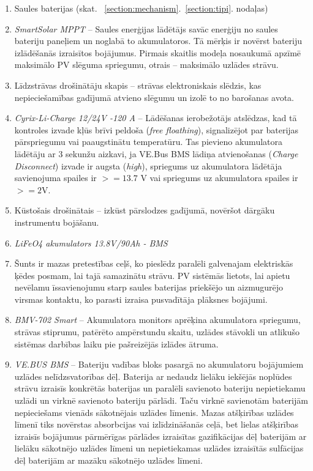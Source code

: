 \begin{enumerate}
\item Saules baterijas (skat. ~\ref{section:mechanism}.~\ref{section:tipi}. nodaļas)
\item \emph{SmartSolar MPPT} --
Saules enerģijas lādētājs savāc enerģiju no saules bateriju paneļiem un noglabā to akumulatoros. Tā mērķis ir novērst bateriju izlādēšanās izraisītos bojājumus. Pirmais skaitlis modeļa nosaukumā apzīmē maksimālo PV slēguma spriegumu, otrais -- maksimālo uzlādes strāvu.
\item Līdzstrāvas drošinātāju skapis --
strāvas elektroniskais slēdzis, kas nepieciešamības gadījumā atvieno slēgumu un izolē to no barošanas avota.
\item \emph{Cyrix-Li-Charge 12/24V -120 A} --
Lādēšanas ierobežotājs atslēdzas, kad tā kontroles izvade kļūs brīvi peldoša (\textit{free floathing}), signalizējot par baterijas pārspriegumu vai paaugstinātu temperatūru. Tas pievieno akumulatora lādētāju ar 3 sekunžu aizkavi, ja VE.Bus BMS lādiņa atvienošanas (\textit{Charge Disconnect}) izvade ir augsta (\textit{high}), spriegums uz akumulatora lādētāja savienojuma spailes ir $>= 13.7$ V vai spriegums uz akumulatora spailes ir $>= 2$V.
\item Kūstošais drošinātais --
izkūst pārslodzes gadījumā, novēršot dārgāku instrumentu bojāšanu.
\item \emph{LiFeO4 akumulators 13.8V/90Ah - BMS}
\item Šunts ir mazas pretestības ceļš, ko pieslēdz paralēli galvenajam elektriskās ķēdes posmam, lai tajā samazinātu strāvu. PV sistēmās lietots, lai apietu nevēlamu īssavienojumu starp saules baterijas priekšējo un aizmugurējo virsmas kontaktu, ko parasti izraisa pusvadītāja plāksnes bojājumi.
\item \emph{BMV-702 Smart} --
Akumulatora monitors aprēķina akumulatora spriegumu, strāvas stiprumu, patērēto ampērstundu skaitu, uzlādes stāvokli un atlikušo sistēmas darbības laiku pie pašreizējās izlādes ātruma.
\item \emph{VE.BUS BMS} --
Bateriju vadības bloks pasargā no akumulatoru bojājumiem uzlādes nelīdzsvatorības dēļ. Baterija ar nedaudz lielāku iekšējās noplūdes strāvu
izraisīs konkrētās baterijas un paralēli savienoto bateriju nepietiekamu uzlādi un virknē savienoto bateriju pārlādi. Taču virknē savienotām baterijām nepieciešams vienāds sākotnējais uzlādes līmenis. Mazas atšķirības uzlādes līmenī tiks novērstas absorbcijas vai izlīdzināšanās ceļā, bet lielas atšķirības izraisīs bojājumus pārmērīgas pārlādes izraisītas gazifikācijas dēļ baterijām ar lielāku sākotnējo uzlādes līmeni un nepietiekamas uzlādes izraisītās sulfācijas dēļ baterijām ar mazāku sākotnējo uzlādes līmeni.


\end{enumerate}
